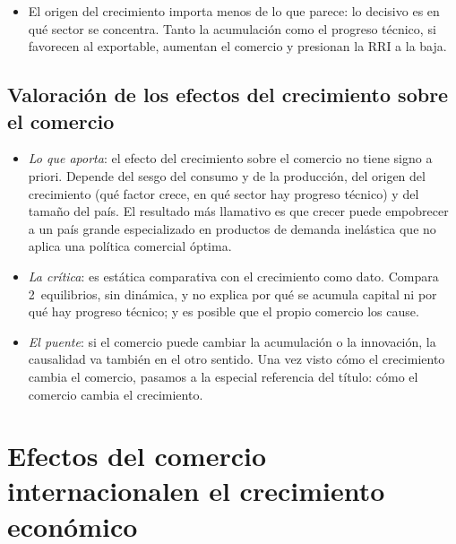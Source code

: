 \documentclass[11pt]{article}
\begin{document}
\begin{itemize}
\item El origen del crecimiento importa menos de lo que parece: lo decisivo es en qué sector se concentra. Tanto la acumulación como el progreso técnico, si favorecen al exportable, aumentan el comercio y presionan la RRI a la baja.
\end{itemize}

\subsection{Valoración de los efectos del crecimiento sobre el comercio}\label{sec:valoracion-I}

\begin{itemize}
\item \emph{Lo que aporta}: el efecto del crecimiento sobre el comercio no tiene signo a priori. Depende del sesgo del consumo y de la producción, del origen del crecimiento (qué factor crece, en qué sector hay progreso técnico) y del tamaño del país. El resultado más llamativo es que crecer puede empobrecer a un país grande especializado en productos de demanda inelástica que no aplica una política comercial óptima.
\item \emph{La crítica}: es estática comparativa con el crecimiento como dato. Compara 2~equilibrios, sin dinámica, y no explica por qué se acumula capital ni por qué hay progreso técnico; y es posible que el propio comercio los cause.
\item \emph{El puente}: si el comercio puede cambiar la acumulación o la innovación, la causalidad va también en el otro sentido. Una vez visto cómo el crecimiento cambia el comercio, pasamos a la especial referencia del título: cómo el comercio cambia el crecimiento.
\end{itemize}

\section{Efectos del comercio internacional\newline en el crecimiento económico}\label{sec:comercio-crecimiento}
\end{document}
